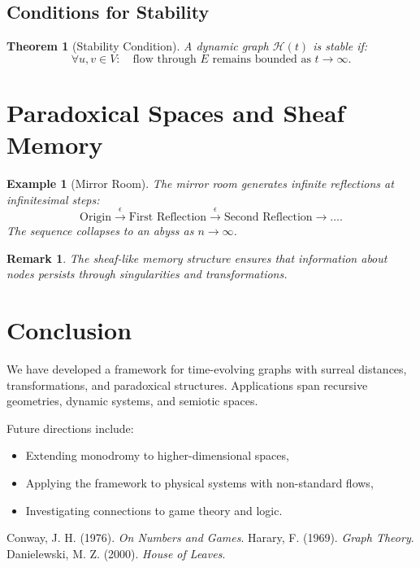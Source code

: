 \documentclass[12pt]{article}
\newcommand{\house}[0]{\mathcal{H}}
\newtheorem{example}{Example}[section]
\newtheorem{remark}{Remark}[section]
\newtheorem{theorem}{Theorem}[section]
\begin{document}
\subsection{Conditions for Stability}
\begin{theorem}[Stability Condition]
A dynamic graph $\house(t)$ is stable if:
\[
\forall u, v \in V: \quad \text{flow through } E \text{ remains bounded as } t \to \infty.
\]
\end{theorem}

\section{Paradoxical Spaces and Sheaf Memory}

\begin{example}[Mirror Room]
The mirror room generates infinite reflections at infinitesimal steps:
\[
\text{Origin} \xrightarrow{\epsilon} \text{First Reflection} \xrightarrow{\epsilon} \text{Second Reflection} \to \dots.
\]
The sequence collapses to an abyss as $n \to \infty$.
\end{example}

\begin{remark}
The \emph{sheaf-like memory} structure ensures that information about nodes persists through singularities and transformations.
\end{remark}

\section{Conclusion}

We have developed a framework for time-evolving graphs with surreal distances, transformations, and paradoxical structures. Applications span recursive geometries, dynamic systems, and semiotic spaces.

Future directions include:
\begin{itemize}
    \item Extending monodromy to higher-dimensional spaces,
    \item Applying the framework to physical systems with non-standard flows,
    \item Investigating connections to game theory and logic.
\end{itemize}


\begin{thebibliography}{9}
 Conway, J. H. (1976). \textit{On Numbers and Games}.
 Harary, F. (1969). \textit{Graph Theory}.
 Danielewski, M. Z. (2000). \textit{House of Leaves}.
\end{thebibliography}
\end{document}
